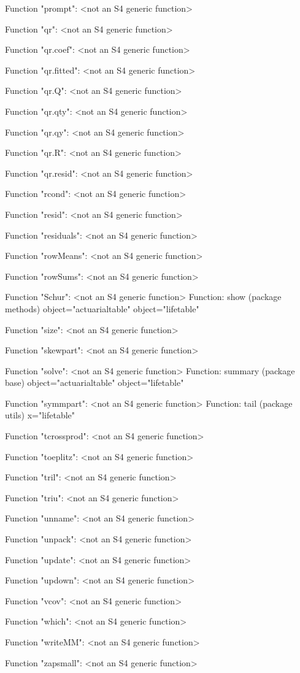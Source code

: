 \documentclass[nojss]{jss}
\begin{document}
\begin{Schunk}
\begin{Soutput}
Function "prompt":
 <not an S4 generic function>

Function "qr":
 <not an S4 generic function>

Function "qr.coef":
 <not an S4 generic function>

Function "qr.fitted":
 <not an S4 generic function>

Function "qr.Q":
 <not an S4 generic function>

Function "qr.qty":
 <not an S4 generic function>

Function "qr.qy":
 <not an S4 generic function>

Function "qr.R":
 <not an S4 generic function>

Function "qr.resid":
 <not an S4 generic function>

Function "rcond":
 <not an S4 generic function>

Function "resid":
 <not an S4 generic function>

Function "residuals":
 <not an S4 generic function>

Function "rowMeans":
 <not an S4 generic function>

Function "rowSums":
 <not an S4 generic function>

Function "Schur":
 <not an S4 generic function>
Function: show (package methods)
object="actuarialtable"
object="lifetable"


Function "size":
 <not an S4 generic function>

Function "skewpart":
 <not an S4 generic function>

Function "solve":
 <not an S4 generic function>
Function: summary (package base)
object="actuarialtable"
object="lifetable"


Function "symmpart":
 <not an S4 generic function>
Function: tail (package utils)
x="lifetable"


Function "tcrossprod":
 <not an S4 generic function>

Function "toeplitz":
 <not an S4 generic function>

Function "tril":
 <not an S4 generic function>

Function "triu":
 <not an S4 generic function>

Function "unname":
 <not an S4 generic function>

Function "unpack":
 <not an S4 generic function>

Function "update":
 <not an S4 generic function>

Function "updown":
 <not an S4 generic function>

Function "vcov":
 <not an S4 generic function>

Function "which":
 <not an S4 generic function>

Function "writeMM":
 <not an S4 generic function>

Function "zapsmall":
 <not an S4 generic function>
\end{Soutput}
\end{Schunk}
\end{document}
